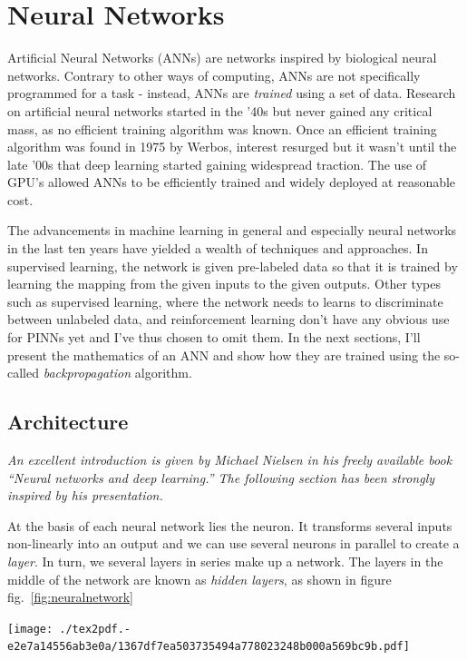 \documentclass[12pt,a4paper,]{harvard-thesis}
\let\origfigure\figure
\let\endorigfigure\endfigure
\renewenvironment{figure}[1][2] {
    \expandafter\origfigure\expandafter[H]
} {
    \endorigfigure
}
\begin{document}
\hypertarget{neural-networks}{%
\section{Neural Networks}\label{neural-networks}}

Artificial Neural Networks (ANNs) are networks inspired by biological
neural networks. Contrary to other ways of computing, ANNs are not
specifically programmed for a task - instead, ANNs are \emph{trained}
using a set of data. Research on artificial neural networks started in
the '40s but never gained any critical mass, as no efficient training
algorithm was known. Once an efficient training algorithm was found in
1975 by Werbos, interest resurged but it wasn't until the late '00s that
deep learning started gaining widespread traction. The use of GPU's
allowed ANNs to be efficiently trained and widely deployed at reasonable
cost.

The advancements in machine learning in general and especially neural
networks in the last ten years have yielded a wealth of techniques and
approaches. In supervised learning, the network is given pre-labeled
data so that it is trained by learning the mapping from the given inputs
to the given outputs. Other types such as supervised learning, where the
network needs to learns to discriminate between unlabeled data, and
reinforcement learning don't have any obvious use for PINNs yet and I've
thus chosen to omit them. In the next sections, I'll present the
mathematics of an ANN and show how they are trained using the so-called
\emph{backpropagation} algorithm.

\hypertarget{architecture}{%
\subsection{Architecture}\label{architecture}}

\emph{An excellent introduction is given by Michael Nielsen in his
freely available book ``Neural networks and deep learning.'' The
following section has been strongly inspired by his presentation.}

At the basis of each neural network lies the neuron. It transforms
several inputs non-linearly into an output and we can use several
neurons in parallel to create a \emph{layer}. In turn, we several layers
in series make up a network. The layers in the middle of the network are
known as \emph{hidden layers}, as shown in figure
fig.~\ref{fig:neuralnetwork}

\begin{figure}
\hypertarget{fig:neuralnetwork}{%
\centering
\texttt{[image: ./tex2pdf.-e2e7a14556ab3e0a/1367df7ea503735494a778023248b000a569bc9b.pdf]}
\caption{Schematic view of a neural network.}\label{fig:neuralnetwork}
}
\end{figure}
\end{document}
